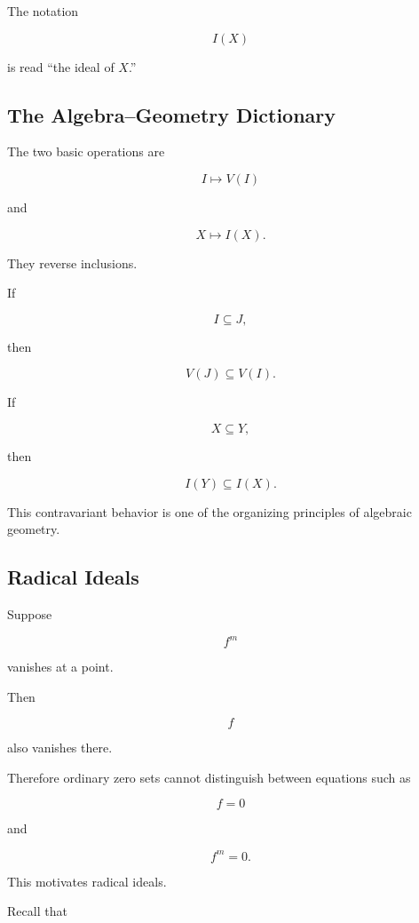 The notation

\[
I(X)
\]

is read ``the ideal of \(X\).''

\subsection{The Algebra--Geometry Dictionary}
\label{subsec:algebra-geometry-dictionary}

The two basic operations are

\[
\boxed{
I
\longmapsto
V(I)
}
\]

and

\[
\boxed{
X
\longmapsto
I(X).
}
\]

They reverse inclusions.

If

\[
I\subseteq J,
\]

then

\[
\boxed{
V(J)\subseteq V(I).
}
\]

If

\[
X\subseteq Y,
\]

then

\[
\boxed{
I(Y)\subseteq I(X).
}
\]

This contravariant behavior is one of the organizing principles of
algebraic geometry.

\subsection{Radical Ideals}
\label{subsec:geometry-radical-ideals}

Suppose

\[
f^m
\]

vanishes at a point.

Then

\[
f
\]

also vanishes there.

Therefore ordinary zero sets cannot distinguish between equations such as

\[
f=0
\]

and

\[
f^m=0.
\]

This motivates radical ideals.

Recall that

